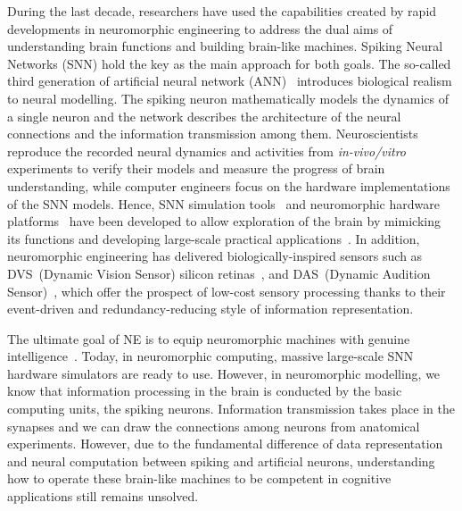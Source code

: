 

During the last decade, researchers have used the capabilities created by rapid developments in neuromorphic engineering to address the dual aims of understanding brain functions and building brain-like machines.
Spiking Neural Networks (SNN) hold the key as the main approach for both goals.
The so-called third generation of artificial neural network (ANN)~\cite{maass1997networks} introduces biological realism to neural modelling.
The spiking neuron mathematically models the dynamics of a single neuron and the network describes the architecture of the neural connections and the information transmission among them.
Neuroscientists reproduce the recorded neural dynamics and activities from \textit{in-vivo/vitro} experiments to verify their models and measure the progress of brain understanding, while computer engineers focus on the hardware implementations of the SNN models.
Hence, SNN simulation tools~\cite{davison2008pynn, gewaltig2007nest, goodman2008brian} and neuromorphic hardware platforms~\cite{furber2014spinnaker,  schemmel2010wafer,benjamin2014neurogrid,merolla2014million} have been developed to allow exploration of the brain by mimicking its functions and developing large-scale practical applications~\cite{eliasmith2012large}.
In addition, neuromorphic engineering has delivered biologically-inspired sensors such as DVS~(Dynamic Vision Sensor) silicon retinas~\cite{serrano2013128, delbruck2008frame, yang2015dynamic, posch2014retinomorphic}, and DAS~(Dynamic Audition Sensor)~\cite{5537164}, which offer the prospect of low-cost sensory processing thanks to their event-driven and redundancy-reducing style of information representation.

The ultimate goal of NE is to equip neuromorphic machines with genuine intelligence~\cite{konar1999artificial}.
Today, in neuromorphic computing, massive large-scale SNN hardware simulators are ready to use.
However, in neuromorphic modelling, we know that information processing in the brain is conducted by the basic computing units, the spiking neurons.
Information transmission takes place in the synapses and we can draw the connections among neurons from anatomical experiments.
However, due to the fundamental difference of data representation and neural computation between spiking and artificial neurons, understanding how to operate these brain-like machines to be competent in cognitive applications still remains unsolved.

